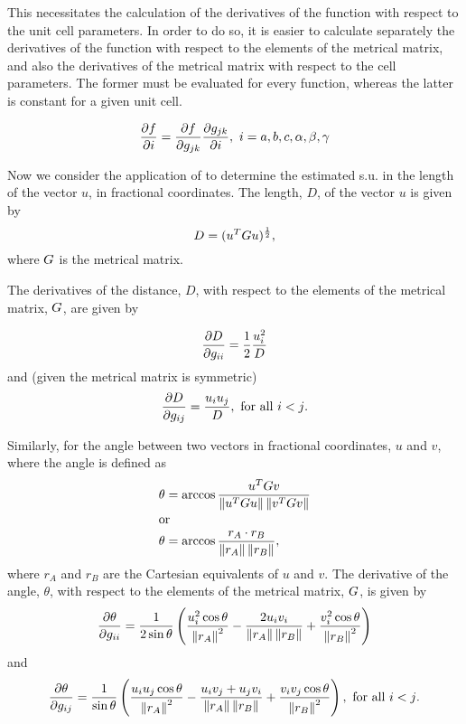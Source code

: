 \documentclass[pdf]{iucr}
\begin{document}
This necessitates the calculation of the derivatives of the function with respect to the unit cell parameters. In order to do so, it is easier to calculate separately the derivatives of the function with respect to the elements of the metrical matrix, and also the derivatives of the metrical matrix with respect to the cell parameters. The former must be evaluated for every function, whereas the latter is constant for a given unit cell.

\begin{equation}
\frac{\partial f}{\partial i} = \frac{\partial f}{\partial g_{jk}}\frac{\partial g_{jk}}{\partial i},\ i=a, b, c, \alpha, \beta, \gamma
\label{eqn:df_dcell}
\end{equation}

Now we consider the application of  to determine the estimated s.u. in the length of the vector $u$, in fractional coordinates. The length, $D$, of the  vector $u$ is given by
\begin{equation}
D = (u^T G u)^\frac{1}{2}
\label{eqn:bond_length},
\end{equation}
where $G$ is the metrical matrix.

The derivatives of the distance, $D$, with respect to the elements of the metrical matrix, $G$, are given by

\begin{equation}
\frac{\partial D}{\partial g_{ii}} = \frac{1}{2} \frac{u_i^2}{D}
\label{eqn:d_distance_d_gii}
\end{equation}
and (given the metrical matrix is symmetric)
\begin{equation}
\frac{\partial D}{\partial g_{ij}} = \frac{u_i u_j}{D},\ \text{for all $i<j$}.
\label{eqn:d_distance_d_gij}
\end{equation}

Similarly, for the angle between two vectors in fractional coordinates, $u$ and $v$, where the angle is defined as
\begin{align}
\theta &= \arccos \frac{u^TGv}{\left\| u^TGu \right\|\left\| v^TGv \right\|} \\
\intertext{or}
\theta &= \arccos \frac{r_{A}\cdot r_{B}}{\left\| r_{A} \right\|\left\| r_{B} \right\|}
\label{eqn:angle_cart},
\end{align}
where $r_{A}$ and $r_{B}$ are the Cartesian equivalents of $u$ and $v$. The derivative of the angle, $\theta$, with respect to the elements of the metrical matrix, $G$, is given by
\begin{equation}
\frac{\partial \theta}{\partial g_{ii}} = \frac{1}{2 \sin\theta} \left(\frac{u_i^2 \cos{\theta}}{\left\| r_{A} \right\|^2} - \frac{2 u_i v_i }{\left\| r_{A} \right\|\left\| r_{B} \right\|} +\frac{v_i^2 \cos{\theta}}{\left\| r_{B} \right\|^2}\right)
\label{eqn:d_angle_d_gii}
\end{equation}
and
\begin{equation}
\frac{\partial \theta}{\partial g_{ij}} = \frac{1}{\sin\theta} \left(\frac{u_i u_j \cos{\theta}}{\left\| r_{A} \right\|^2} - \frac{u_i v_j + u_j v_i }{\left\| r_{A} \right\|\left\| r_{B} \right\|} +\frac{v_i v_j \cos{\theta}}{\left\| r_{B} \right\|^2}\right),\ \text{for all $i<j$}.
\label{eqn:d_angle_d_gij}
\end{equation}
\end{document}
